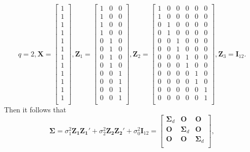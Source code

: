	\[
	q = 2,  \bm X = \left[
	\begin{array}{c}
	1\\
	1\\
	1\\
	1\\
	1\\
	1\\
	1\\
	1\\
	1\\
	1\\
	1\\
	1\\
	\end{array}
	\right],
	\bm Z_1=\left[
	\begin{array}{ccc}
	1 & 0 & 0 \\
	1 & 0 & 0 \\
	1 & 0 & 0 \\
	1 & 0 & 0 \\
	0 & 1 & 0 \\
	0 & 1 & 0 \\
	0 & 1 & 0 \\
	0 & 1 & 0 \\
	0 & 0 & 1 \\
	0 & 0 & 1 \\
	0 & 0 & 1 \\
	0 & 0 & 1 \\
	\end{array}
	\right],
	\bm Z_2=\left[
	\begin{array}{cccccc}
	1 & 0 & 0  & 0 & 0  &0\\
	1 & 0 & 0  & 0 & 0  &0\\
	0 & 1 & 0  & 0 & 0  &0\\
	0 & 1 & 0  & 0 & 0  &0\\
	0 & 0 & 1  & 0 & 0  &0\\
	0 & 0 & 1  & 0 & 0  &0\\
	0 & 0 & 0  & 1 & 0  &0\\
	0 & 0 & 0  & 1 & 0  &0\\
	0 & 0 & 0  & 0 & 1  &0\\
	0 & 0 & 0  & 0 & 1  &0\\
	0 & 0 & 0  & 0 & 0  &1\\
	0 & 0 & 0  & 0 & 0  &1\\
	\end{array}
	\right], \bm Z_3 = \bm I_{12}.
	\]
	Then it follows that 
	\[\bm\Sigma = \sigma_1^2\bm{Z_1Z_1'} + \sigma_2^2\bm{Z_2Z_2'} + \sigma_0^2\bm I_{12}=
	\left[
	\begin{array}{ccc}
	\bm\Sigma_d  & \bm O  &\bm O\\
	\bm O & \bm\Sigma_d  & \bm O \\
	\bm O  &\bm O   & \bm\Sigma_d\\
	\end{array}
	\right],\]
